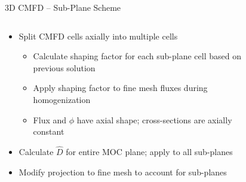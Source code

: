 \begin{frame}[t]{3D CMFD -- Sub-Plane Scheme}

\begin{columns}
  \begin{column}{0.6\textwidth}
    \begin{itemize}
      \item Split CMFD cells axially into multiple cells
      \begin{itemize}
        \item Calculate shaping factor for each sub-plane cell based on 
        previous solution
        \item Apply shaping factor to fine mesh fluxes during homogenization
        \item Flux and $\phi$ have axial shape; cross-sections are axially 
        constant
      \end{itemize}
      \item Calculate $\hat{D}$ for entire MOC plane; apply to all sub-planes
      \item Modify projection to fine mesh to account for sub-planes
    \end{itemize}
  \end{column}
  \begin{column}{0.4\textwidth}
    \begin{figure}[h]
      \centering
      \resizebox{!}{0.7\textheight}{}
    \end{figure}
  \end{column}
\end{columns}

\end{frame}


